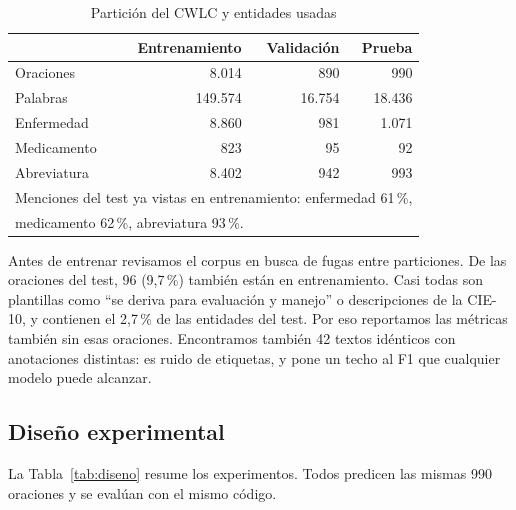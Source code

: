 \documentclass[10pt,journal,a4paper]{IEEEtran}
\begin{document}
\begin{table}[!t]
\centering
\caption{Partici\'on del CWLC y entidades usadas}
\label{tab:corpus}
\begin{tabular}{lrrr}
\toprule
 & Entrenamiento & Validaci\'on & Prueba \\
\midrule
Oraciones & 8.014 & 890 & 990 \\
Palabras & 149.574 & 16.754 & 18.436 \\
Enfermedad & 8.860 & 981 & 1.071 \\
Medicamento & 823 & 95 & 92 \\
Abreviatura & 8.402 & 942 & 993 \\
\midrule
\multicolumn{4}{l}{\footnotesize Menciones del test ya vistas en entrenamiento: enfermedad 61\,\%,}\\
\multicolumn{4}{l}{\footnotesize medicamento 62\,\%, abreviatura 93\,\%.}\\
\bottomrule
\end{tabular}
\end{table}

Antes de entrenar revisamos el corpus en busca de fugas entre particiones. De las oraciones del test, 96 (9,7\,\%) también están en entrenamiento. Casi todas son plantillas como ``se deriva para evaluación y manejo'' o descripciones de la CIE-10, y contienen el 2,7\,\% de las entidades del test. Por eso reportamos las métricas también sin esas oraciones. Encontramos también 42 textos idénticos con anotaciones distintas: es ruido de etiquetas, y pone un techo al F1 que cualquier modelo puede alcanzar.

\subsection{Diseño experimental}

La Tabla~\ref{tab:diseno} resume los experimentos. Todos predicen las mismas 990 oraciones y se evalúan con el mismo código.
\end{document}
